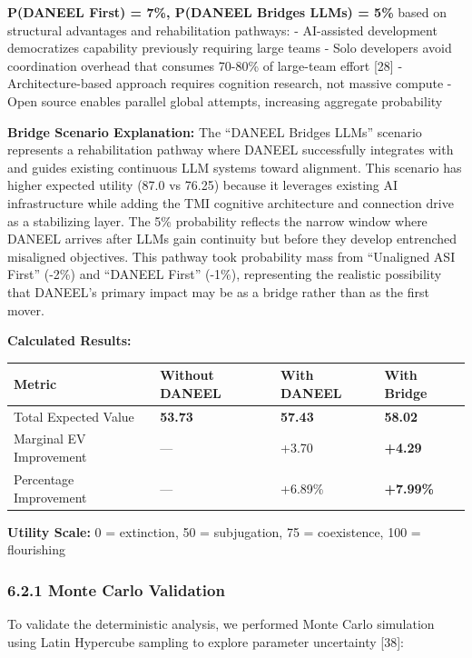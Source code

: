 \documentclass[
  11pt,
]{article}
\newcounter{none} %
\begin{document}
\textbf{P(DANEEL First) = 7\%, P(DANEEL Bridges LLMs) = 5\%} based on
structural advantages and rehabilitation pathways: - AI-assisted
development democratizes capability previously requiring large teams -
Solo developers avoid coordination overhead that consumes 70-80\% of
large-team effort {[}28{]} - Architecture-based approach requires
cognition research, not massive compute - Open source enables parallel
global attempts, increasing aggregate probability

\textbf{Bridge Scenario Explanation:} The ``DANEEL Bridges LLMs''
scenario represents a rehabilitation pathway where DANEEL successfully
integrates with and guides existing continuous LLM systems toward
alignment. This scenario has higher expected utility (87.0 vs 76.25)
because it leverages existing AI infrastructure while adding the TMI
cognitive architecture and connection drive as a stabilizing layer. The
5\% probability reflects the narrow window where DANEEL arrives after
LLMs gain continuity but before they develop entrenched misaligned
objectives. This pathway took probability mass from ``Unaligned ASI
First'' (-2\%) and ``DANEEL First'' (-1\%), representing the realistic
possibility that DANEEL's primary impact may be as a bridge rather than
as the first mover.

\textbf{Calculated Results:}

{\def\LTcaptype{none} %
\begin{longtable}[]{@{}llll@{}}
\toprule\noalign{}
Metric & Without DANEEL & With DANEEL & With Bridge \\
\midrule\noalign{}
\endhead
\bottomrule\noalign{}
\endlastfoot
Total Expected Value & \textbf{53.73} & \textbf{57.43} &
\textbf{58.02} \\
Marginal EV Improvement & --- & +3.70 & \textbf{+4.29} \\
Percentage Improvement & --- & +6.89\% & \textbf{+7.99\%} \\
\end{longtable}
}

\textbf{Utility Scale:} 0 = extinction, 50 = subjugation, 75 =
coexistence, 100 = flourishing

\subsubsection{6.2.1 Monte Carlo
Validation}\label{monte-carlo-validation}

To validate the deterministic analysis, we performed Monte Carlo
simulation using Latin Hypercube sampling to explore parameter
uncertainty {[}38{]}:
\end{document}
